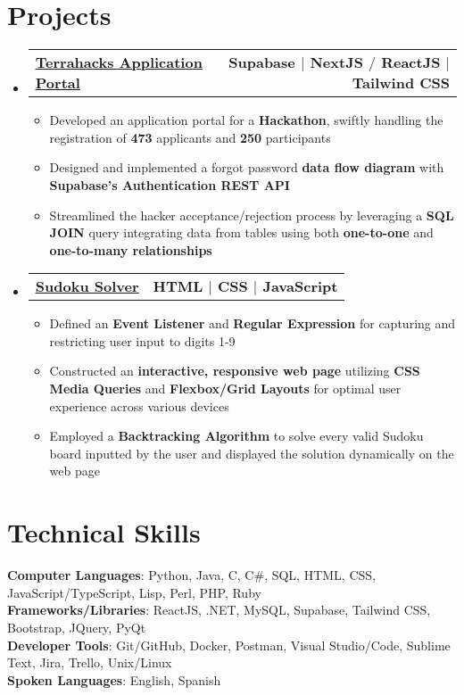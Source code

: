 \documentclass[letterpaper,11pt]{article}
\makeatletter
\newcommand{\resumeItem}[1]{
  \item\small{
    {#1 \vspace{-2pt}}
  }
}
\newcommand{\resumeProjectHeading}[2]{
    \item
    \begin{tabular*}{1.00\textwidth}{l@{\extracolsep{\fill}}r}
      \small#1 & #2 \\
    \end{tabular*}\vspace{-7pt}
    
}
\newcommand{\resumeSubHeadingListStart}{\begin{itemize}[leftmargin=0.0in, label={}]}
\newcommand{\resumeSubHeadingListEnd}{\end{itemize} \vspace{-18pt}}
\newcommand{\resumeItemListStart}{\begin{itemize}}
\newcommand{\resumeItemListEnd}{\end{itemize}\vspace{-4pt}}
\makeatother
\begin{document}
\section{Projects}
    \resumeSubHeadingListStart
      \vspace{-3pt}
      \resumeProjectHeading
        {
        \textbf{\href{https://portal.terrahacks.ca}
        {\color{blue}\underline{Terrahacks Application Portal}}}
        }{\textbf{Supabase $|$ NextJS $/$ ReactJS $|$ Tailwind CSS}}
        \resumeItemListStart
            \resumeItem{Developed an application portal for a \textbf{Hackathon}, swiftly handling the registration of \textbf{473} applicants and \textbf{250} participants}
            \resumeItem{Designed and implemented a forgot password \textbf{data flow diagram} with \textbf{Supabase's  Authentication REST API}}
            \resumeItem{Streamlined the hacker acceptance/rejection process by leveraging a \textbf{SQL JOIN} query integrating data from tables using both \textbf{one-to-one} and  
            \textbf{one-to-many relationships}}
          \resumeItemListEnd
      \vspace{-7pt}
      \resumeProjectHeading
          {
          \textbf{\href{https://nicholas489.github.io/Sudoku_Solver/}{\color{blue}\underline{Sudoku Solver}}}
          }{\textbf{HTML $|$ CSS $|$ JavaScript}}
          \resumeItemListStart
            \resumeItem{Defined an \textbf{Event Listener} and \textbf{Regular Expression} for capturing and restricting user input to digits 1-9}
            \resumeItem{Constructed an \textbf{interactive, responsive web page} utilizing \textbf{CSS Media Queries} and \textbf{Flexbox/Grid Layouts} for optimal user experience across various devices}
            \resumeItem{Employed a \textbf{Backtracking Algorithm} to solve every valid Sudoku board inputted by the user and displayed the solution dynamically on the web page}
          \resumeItemListEnd
      \vspace{-3pt}
    \resumeSubHeadingListEnd
    
%
\section{Technical Skills}
 \begin{itemize}[leftmargin=0.0in, label={}]
    \small{\item{
     \textbf{Computer Languages}{: Python, Java, C, C\#, SQL, HTML, CSS, JavaScript/TypeScript, Lisp, Perl, PHP, Ruby} \\
     \textbf{Frameworks/Libraries}{: ReactJS, .NET, MySQL, Supabase, Tailwind CSS, Bootstrap, JQuery, PyQt} \\
     \textbf{Developer Tools}{: Git/GitHub, Docker, Postman, Visual Studio/Code, Sublime Text, Jira, Trello, Unix/Linux} \\
     \textbf{Spoken Languages}{: English, Spanish}
    }}
 \end{itemize}
\end{document}

